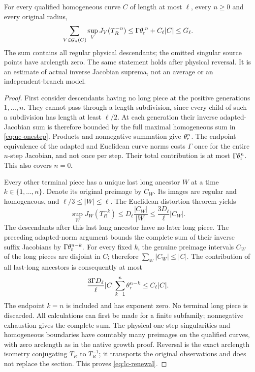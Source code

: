 \begin{theorem}\label{thm:lc-renewal}
For every qualified homogeneous curve $C$ of length at most $\ell$,
every $n\ge0$ and every original radius,
\begin{equation}\label{eq:lc-renewal}
 \sum_{V\in\mathcal G_n(C)}
        \sup_V J_V(T_R^{-n})
       \le \Gamma\theta_{\rm r}^{,n}+C_\ell|C|
       \le G_\ell.
\end{equation}
The sum contains all regular physical descendants; the omitted singular
source points have arclength zero.  The same statement holds after
physical reversal.  It is an estimate of actual inverse Jacobian
suprema, not an average or an independent-branch model.
\end{theorem}
\begin{proof}
First consider descendants having no long piece at the positive
generations $1,\ldots,n$.  They cannot pass through a length subdivision,
since every child of such a subdivision has length at least $\ell/2$.
At each generation their inverse adapted-Jacobian sum is therefore
bounded by the full maximal homogeneous sum in
\eqref{eq:uc-onestep}.  Products and nonnegative summation give
$\theta_{\rm r}^n$.  The endpoint equivalence of the adapted and
Euclidean curve norms costs $\Gamma$ once for the entire $n$-step
Jacobian, and not once per step.  Their total contribution is at most
$\Gamma\theta_{\rm r}^n$.  This also covers $n=0$.

Every other terminal piece has a unique last long ancestor $W$ at a
time $k\in\{1,\ldots,n\}$.  Denote its original preimage by $C_W$.
Its images are regular and homogeneous, and $\ell/3\le |W|\le\ell$.
The Euclidean distortion theorem yields
\[
 \sup_W J_W(T_R^{-k})
 \le D_\ell\frac{|C_W|}{|W|}
 \le \frac{3D_\ell}{\ell}|C_W|.
\]
The descendants after this last long ancestor have no later long
piece.  The preceding adapted-norm argument bounds the complete sum
of their inverse suffix Jacobians by
$\Gamma\theta_{\rm r}^{n-k}$.  For every fixed $k$, the genuine
preimage intervals $C_W$ of the long pieces are disjoint in $C$;
therefore $\sum_W|C_W|\le |C|$.  The contribution of all last-long
ancestors is consequently at most
\[
 \frac{3\Gamma D_\ell}{\ell}|C|
       \sum_{k=1}^{n}\theta_{\rm r}^{n-k}
 \le C_\ell|C|.
\]
The endpoint $k=n$ is included and has exponent zero.  No terminal
long piece is discarded.  All calculations can first be made for a
finite subfamily; nonnegative exhaustion gives the complete sum.
The physical one-step singularities and homogeneous boundaries have
countably many preimages on the qualified curves, with zero arclength
as in the native growth proof.  Reversal is the exact arclength
isometry conjugating $T_R$ to $T_R^{-1}$; it transports the original
observations and does not replace the section.  This proves
\eqref{eq:lc-renewal}.
\end{proof}

